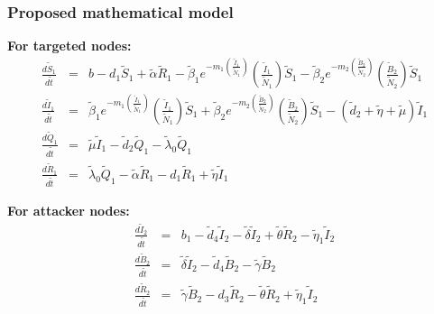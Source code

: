 \documentclass{beamer}
\begin{document}
\begin{frame}\frametitle{Proposed mathematical model}
{\bf For targeted nodes:}
{\footnotesize \begin{eqnarray*}
  \frac{d \tilde S_1}{d \tilde t}  &=&  b-d_1 \tilde S_1+ \tilde \alpha \tilde R_1 - \tilde \beta_1 e^{-m_1 \left(\frac{ \tilde I_1}{ \tilde N_1}\right)}\left(\frac{ \tilde I_1}{ \tilde N_1}\right) \tilde S_1- \tilde \beta_2 e^{-m_2 \left(\frac{ \tilde B_2}{ \tilde N_2}\right)} \left(\frac{ \tilde B_2}{ \tilde N_2}\right) \tilde S_1\\
   \frac{d \tilde I_1}{d \tilde t} &=& \tilde \beta_1 e^{-m_1 \left(\frac{\tilde I_1}{\tilde N_1}\right)}\left(\frac{\tilde I_1}{\tilde N_1}\right) \tilde S_1+\tilde \beta_2 e^{-m_2 \left(\frac{\tilde B_2}{\tilde N_2}\right)} \left(\frac{\tilde B_2}{\tilde N_2}\right)\tilde S_1 - (\tilde d_2+ \tilde\eta +\tilde \mu)\tilde I_1 \\
  \frac{d \tilde Q_1}{d \tilde t} &=& \tilde \mu \tilde I_1 -\tilde d_2 \tilde Q_1 - \tilde \lambda_0 \tilde Q_1 \\
 \frac{d \tilde R_1}{d \tilde t} &=&  \tilde\lambda_0 \tilde Q_1-\tilde \alpha \tilde R_1-d_1 \tilde R_1+ \tilde\eta \tilde I_1
\end{eqnarray*}}

{\bf For attacker nodes:}
{\footnotesize \begin{eqnarray*}
 \frac{d \tilde I_2}{d \tilde t} &=& b_1- \tilde d_4 \tilde I_2-\tilde \delta \tilde I_2 +\tilde \theta \tilde R_2 -\tilde\eta_1 \tilde I_2 \\
 \frac{d \tilde B_2}{d \tilde t} &=& \tilde\delta\tilde I_2 -\tilde d_4 \tilde B_2 -\tilde\gamma\tilde B_2 \\
\frac{d \tilde R_2}{d \tilde t} &=& \tilde\gamma \tilde B_2 - d_3 \tilde R_2 - \tilde \theta\tilde R_2+\tilde \eta_1\tilde I_2
\end{eqnarray*}}
\end{frame}
\end{document}
